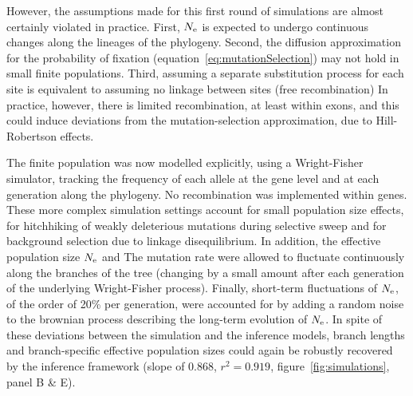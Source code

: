 \documentclass{MBE}
\begin{document}
	However, the assumptions made for this first round of simulations are almost certainly violated in practice.
	First, $N_{\text{e}}$ is expected to undergo continuous changes along the lineages of the phylogeny.
	Second, the diffusion approximation for the probability of fixation (equation~\ref{eq:mutationSelection}) may not hold in small finite populations.
	Third, assuming a separate {substitution} process for each site is equivalent to assuming no linkage between sites (free recombination)
	In practice, however, there is limited {recombination}, at least within exons, and this could induce deviations from the mutation-selection approximation, due to Hill-Robertson effects.

	The finite population was now modelled explicitly, using a Wright-Fisher simulator, tracking the frequency of each {allele} at the gene level and at each generation along the phylogeny.
	No {recombination} was implemented within genes.
	These more complex simulation settings account for small population size effects, for hitchhiking of weakly deleterious mutations during selective sweep and for background selection due to linkage disequilibrium.
	In addition, the {effective population size} $N_{\text{e}}$ and The mutation rate were allowed to fluctuate continuously along the branches of the tree (changing by a small amount after each generation of the underlying Wright-Fisher process).
	Finally, short-term fluctuations of $N_{\text{e}}$, of the order of 20\% per generation, were accounted for by adding a random noise to the brownian process describing the long-term evolution of $N_{\text{e}}$.
	In spite of these deviations between the simulation and the inference models, branch lengths and branch-specific {effective population sizes} could again be robustly recovered by the inference framework (slope of $0.868$, $r^2=0.919$, figure~\ref{fig:simulations}, panel B \& E).
\end{document}

